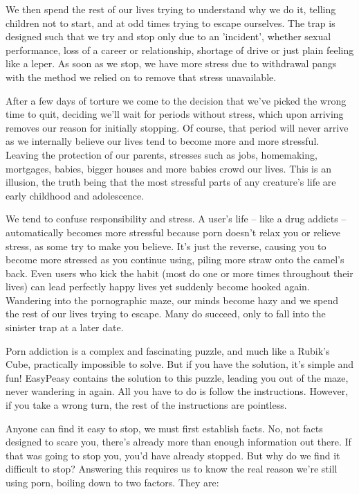 \documentclass[
]{book}
\begin{document}
We then spend the rest of our lives trying to understand why we do it, telling children not to start, and at odd times trying to escape ourselves. The trap is designed such that we try and stop only due to an 'incident', whether sexual performance, loss of a career or relationship, shortage of drive or just plain feeling like a leper. As soon as we stop, we have more stress due to withdrawal pangs with the method we relied on to remove that stress unavailable.

After a few days of torture we come to the decision that we've picked the wrong time to quit, deciding we'll wait for periods without stress, which upon arriving removes our reason for initially stopping. Of course, that period will never arrive as we internally believe our lives tend to become more and more stressful. Leaving the protection of our parents, stresses such as jobs, homemaking, mortgages, babies, bigger houses and more babies crowd our lives. This is an illusion, the truth being that the most stressful parts of any creature's life are early childhood and adolescence.

We tend to confuse responsibility and stress. A user's life -- like a drug addicts -- automatically becomes more stressful because porn doesn't relax you or relieve stress, as some try to make you believe. It's just the reverse, causing you to become more stressed as you continue using, piling more straw onto the camel's back. Even users who kick the habit (most do one or more times throughout their lives) can lead perfectly happy lives yet suddenly become hooked again. Wandering into the pornographic maze, our minds become hazy and we spend the rest of our lives trying to escape. Many do succeed, only to fall into the sinister trap at a later date.

Porn addiction is a complex and fascinating puzzle, and much like a Rubik's Cube, practically impossible to solve. But if you have the solution, it's simple and fun! EasyPeasy contains the solution to this puzzle, leading you out of the maze, never wandering in again. All you have to do is follow the instructions. However, if you take a wrong turn, the rest of the instructions are pointless.

Anyone can find it easy to stop, we must first establish facts. No, not facts designed to scare you, there's already more than enough information out there. If that was going to stop you, you'd have already stopped. But why do we find it difficult to stop? Answering this requires us to know the real reason we're still using porn, boiling down to two factors. They are:
\end{document}
